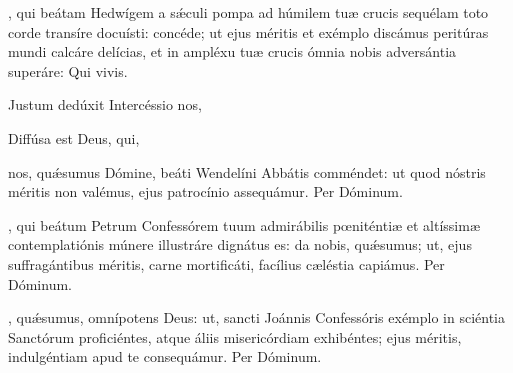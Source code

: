 \documentclass[fontsize=9pt,paper=A6,twoside,BCOR=1mm,DIV=22,headinclude]{scrarticle}
\begin{document}
\begin{multicols}{2}
{

\AiiNV

\VRNVii

, qui beátam Hedwígem a sǽculi pompa ad húmilem tuæ crucis sequélam toto corde transíre docuísti: concéde; ut ejus méritis et exémplo discámus peritúras mundi calcáre delícias, et in ampléxu tuæ crucis ómnia nobis adversántia superáre: Qui vivis.


\AiiiC

\V Justum dedúxit  Intercéssio nos, 

\AiiiNV

\V Diffúsa est  Deus, qui, 


}



{
\MiC 

\VRCi 

 nos, qu\'æsumus Dómine, beáti Wendelíni Abbátis comméndet: ut quod nóstris méritis non valémus, ejus patrocínio assequámur. Per Dóminum.


\AiiiC 

\VRCiii 


, qui beátum Petrum Confessórem tuum admirábilis pœniténtiæ et altíssimæ contemplatiónis múnere illustráre dignátus es: da nobis, quǽsumus; ut, ejus suffragántibus méritis, carne mortificáti, facílius cæléstia capiámus. \red{(}Per Dóminum.\red{)}


\AiiC 

\VRCiv


, quǽsumus, omnípotens Deus: ut, sancti Joánnis Confessóris exémplo in sciéntia Sanctórum proficiéntes, atque áliis misericórdiam exhibéntes; ejus méritis, indulgéntiam apud te consequámur. Per Dóminum.


}
\end{multicols}
\end{document}

